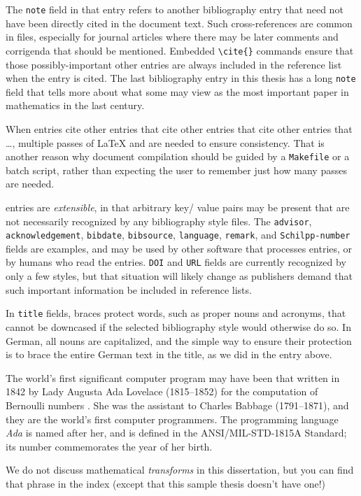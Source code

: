 The \texttt{note} field in that entry refers to another bibliography
entry that need not have been directly cited in the document text.
Such cross-references are common in \BibTeX{} files, especially for
journal articles where there may be later comments and corrigenda that
should be mentioned.  Embedded \verb=\cite{}= commands ensure that
those possibly-important other entries are always included in the
reference list when the entry is cited.  The last bibliography entry
\cite{Wiles:1995:MEC} in this thesis has a long \texttt{note} field
that tells more about what some may view as the most important paper
in mathematics in the last century.

When entries cite other entries that cite other entries that cite
other entries that \ldots{}, multiple passes of \LaTeX{} and \BibTeX{}
are needed to ensure consistency.  That is another reason why document
compilation should be guided by a \texttt{Makefile} or a batch script,
rather than expecting the user to remember just how many passes are
needed.

\BibTeX{} entries are \emph{extensible}, in that arbitrary key\slash
value pairs may be present that are not necessarily recognized by any
bibliography style files.  The \texttt{advisor},
\texttt{acknowledgement}, \texttt{bibdate}, \texttt{bibsource},
\texttt{language}, \texttt{remark}, and \texttt{Schilpp-number} fields
are examples, and may be used by other software that processes
\BibTeX{} entries, or by humans who read the entries.  \texttt{DOI}
and \texttt{URL} fields are currently recognized by only a few styles,
but that situation will likely change as publishers demand that such
important information be included in reference lists.

In \BibTeX{} \texttt{title} fields, braces protect words, such as
proper nouns and acronyms, that cannot be downcased if the selected
bibliography style would otherwise do so.  In German, all nouns are
capitalized, and the simple way to ensure their protection is to brace
the entire German text in the title, as we did in the entry above.

The world's first significant computer program may
have been that written in 1842 by Lady Augusta Ada
Lovelace (1815--1852) for the computation of Bernoulli
numbers \cite{Huskey:1980:LLC,Kim:1999:AFC}.  She
was the assistant to Charles Babbage
(1791--1871), and they are the world's first
computer programmers. The programming language
\emph{Ada} is named after her, and is defined in
the ANSI/MIL-STD-1815A Standard; its number
commemorates the year of her birth.

We do not discuss mathematical \emph{transforms}
in this dissertation, but you can find that phrase
in the index (except that this sample thesis doesn't have one!)

\blah

\blah
\blah

\blah
